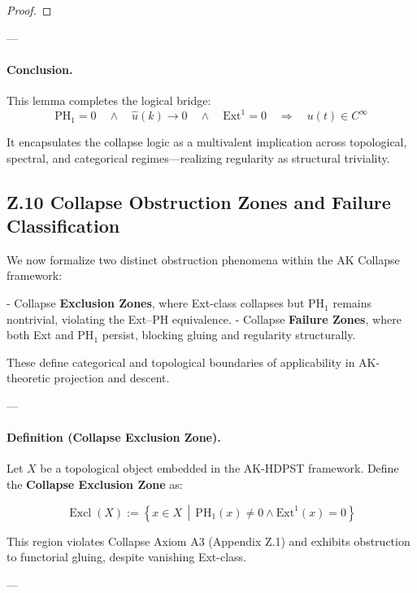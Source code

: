 \documentclass[11pt]{article}
\begin{document}
\begin{axiom}
\begin{axiom}
{{\begin{proof}
\end{proof}

---

\paragraph{Conclusion.}
This lemma completes the logical bridge:
\[
\boxed{
\mathrm{PH}_1 = 0 \quad \wedge \quad \widehat{u}(k) \to 0 \quad \wedge \quad \mathrm{Ext}^1 = 0
\quad \Longrightarrow \quad u(t) \in C^\infty
}
\]

It encapsulates the collapse logic as a multivalent implication  
across topological, spectral, and categorical regimes—realizing regularity as structural triviality.



\subsection*{Z.10 Collapse Obstruction Zones and Failure Classification}

We now formalize two distinct obstruction phenomena within the AK Collapse framework:

- Collapse \textbf{Exclusion Zones}, where Ext-class collapses but PH$_1$ remains nontrivial, violating the Ext–PH equivalence.
- Collapse \textbf{Failure Zones}, where both Ext and PH$_1$ persist, blocking gluing and regularity structurally.

These define categorical and topological boundaries of applicability in AK-theoretic projection and descent.

---

\paragraph{Definition (Collapse Exclusion Zone).}
Let \( X \) be a topological object embedded in the AK-HDPST framework.  
Define the \textbf{Collapse Exclusion Zone} as:

\[
\operatorname{Excl}(X) := \left\{ x \in X \,\middle|\, \mathrm{PH}_1(x) \neq 0 \land \mathrm{Ext}^1(x) = 0 \right\}
\]

This region violates Collapse Axiom A3 (Appendix Z.1) and exhibits obstruction to functorial gluing, despite vanishing Ext-class.

---

}}
\end{axiom}
\end{axiom}
\end{document}
